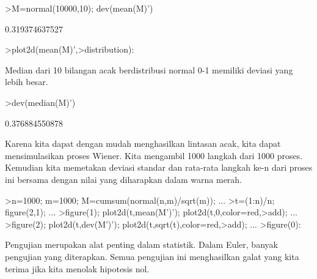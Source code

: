 \documentclass[a4paper,10pt]{article}
\begin{document}
\begin{eulernotebook}
\begin{eulerprompt}
>M=normal(10000,10); dev(mean(M)')
\end{eulerprompt}
\begin{euleroutput}
  0.319374637527
\end{euleroutput}
\begin{eulerprompt}
>plot2d(mean(M)',>distribution):
\end{eulerprompt}
\begin{eulercomment}
Median dari 10 bilangan acak berdistribusi normal 0-1 memiliki deviasi
yang lebih besar.
\end{eulercomment}
\begin{eulerprompt}
>dev(median(M)')
\end{eulerprompt}
\begin{euleroutput}
  0.376884550878
\end{euleroutput}
\begin{eulercomment}
Karena kita dapat dengan mudah menghasilkan lintasan acak, kita dapat
mensimulasikan proses Wiener. Kita mengambil 1000 langkah dari 1000
proses. Kemudian kita memetakan deviasi standar dan rata-rata langkah
ke-n dari proses ini bersama dengan nilai yang diharapkan dalam warna
merah.
\end{eulercomment}
\begin{eulerprompt}
>n=1000; m=1000; M=cumsum(normal(n,m)/sqrt(m)); ...
>t=(1:n)/n; figure(2,1); ...
>figure(1); plot2d(t,mean(M')'); plot2d(t,0,color=red,>add); ...
>figure(2); plot2d(t,dev(M')'); plot2d(t,sqrt(t),color=red,>add); ...
>figure(0):
\end{eulerprompt}
\begin{eulercomment}
Pengujian merupakan alat penting dalam statistik. Dalam Euler, banyak
pengujian yang diterapkan. Semua pengujian ini menghasilkan galat yang
kita terima jika kita menolak hipotesis nol.


\end{eulercomment}
\end{eulernotebook}
\end{document}
